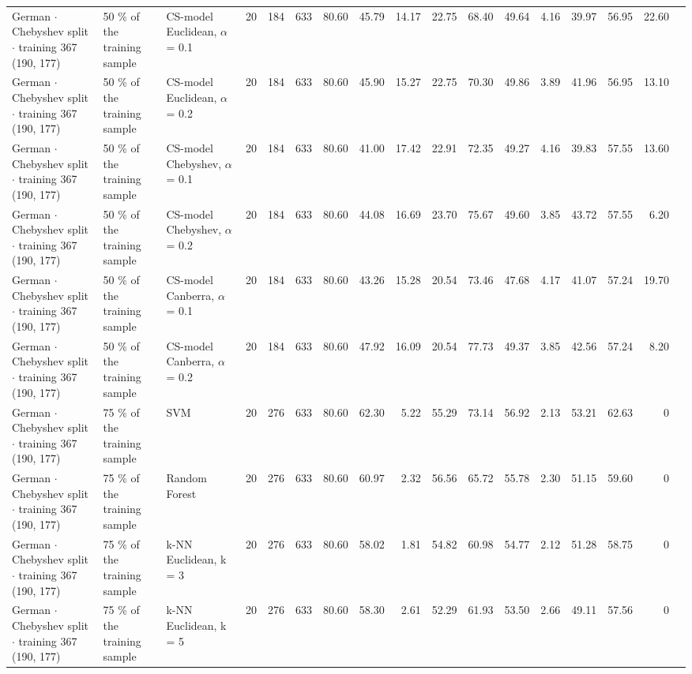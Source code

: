 \begin{longtable}{lllrrrrrrrrrrrrrl}
  German $\cdot$ Chebyshev split $\cdot$ training 367 (190, 177) & 50 \% of the training sample & CS-model Euclidean, $\alpha$ = 0.1 & 20 & 184 & 633 & 80.60 & 45.79 & 14.17 & 22.75 & 68.40 & 49.64 & 4.16 & 39.97 & 56.95 & 22.60 &  \\
  German $\cdot$ Chebyshev split $\cdot$ training 367 (190, 177) & 50 \% of the training sample & CS-model Euclidean, $\alpha$ = 0.2 & 20 & 184 & 633 & 80.60 & 45.90 & 15.27 & 22.75 & 70.30 & 49.86 & 3.89 & 41.96 & 56.95 & 13.10 &  \\
  German $\cdot$ Chebyshev split $\cdot$ training 367 (190, 177) & 50 \% of the training sample & CS-model Chebyshev, $\alpha$ = 0.1 & 20 & 184 & 633 & 80.60 & 41.00 & 17.42 & 22.91 & 72.35 & 49.27 & 4.16 & 39.83 & 57.55 & 13.60 &  \\
  German $\cdot$ Chebyshev split $\cdot$ training 367 (190, 177) & 50 \% of the training sample & CS-model Chebyshev, $\alpha$ = 0.2 & 20 & 184 & 633 & 80.60 & 44.08 & 16.69 & 23.70 & 75.67 & 49.60 & 3.85 & 43.72 & 57.55 & 6.20 &  \\
  German $\cdot$ Chebyshev split $\cdot$ training 367 (190, 177) & 50 \% of the training sample & CS-model Canberra, $\alpha$ = 0.1 & 20 & 184 & 633 & 80.60 & 43.26 & 15.28 & 20.54 & 73.46 & 47.68 & 4.17 & 41.07 & 57.24 & 19.70 &  \\
  German $\cdot$ Chebyshev split $\cdot$ training 367 (190, 177) & 50 \% of the training sample & CS-model Canberra, $\alpha$ = 0.2 & 20 & 184 & 633 & 80.60 & 47.92 & 16.09 & 20.54 & 77.73 & 49.37 & 3.85 & 42.56 & 57.24 & 8.20 &  \\
  German $\cdot$ Chebyshev split $\cdot$ training 367 (190, 177) & 75 \% of the training sample & SVM & 20 & 276 & 633 & 80.60 & 62.30 & 5.22 & 55.29 & 73.14 & 56.92 & 2.13 & 53.21 & 62.63 & 0 &  \\
  German $\cdot$ Chebyshev split $\cdot$ training 367 (190, 177) & 75 \% of the training sample & Random Forest & 20 & 276 & 633 & 80.60 & 60.97 & 2.32 & 56.56 & 65.72 & 55.78 & 2.30 & 51.15 & 59.60 & 0 &  \\
  German $\cdot$ Chebyshev split $\cdot$ training 367 (190, 177) & 75 \% of the training sample & k-NN Euclidean, k = 3 & 20 & 276 & 633 & 80.60 & 58.02 & 1.81 & 54.82 & 60.98 & 54.77 & 2.12 & 51.28 & 58.75 & 0 &  \\
  German $\cdot$ Chebyshev split $\cdot$ training 367 (190, 177) & 75 \% of the training sample & k-NN Euclidean, k = 5 & 20 & 276 & 633 & 80.60 & 58.30 & 2.61 & 52.29 & 61.93 & 53.50 & 2.66 & 49.11 & 57.56 & 0 &  \\

\end{longtable}
